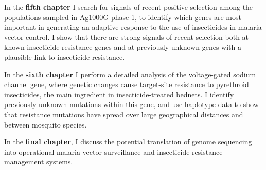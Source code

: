 In the \textbf{fifth chapter} I search for signals of recent positive selection among the populations sampled in Ag1000G phase 1, to identify which genes are most important in generating an adaptive response to the use of insecticides in malaria vector control.
%
I show that there are strong signals of recent selection both at known insecticide resistance genes and at previously unknown genes with a plausible link to insecticide resistance.


In the \textbf{sixth chapter} I perform a detailed analysis of the voltage-gated sodium channel gene, where genetic changes cause target-site resistance to pyrethroid insecticides, the main ingredient in insecticide-treated bednets.
%
I identify previously unknown mutations within this gene, and use haplotype data to show that resistance mutations have spread over large geographical distances and between mosquito species.


In the \textbf{final chapter}, I discuss the potential translation of genome sequencing into operational malaria vector surveillance and insecticide resistance management systems.


